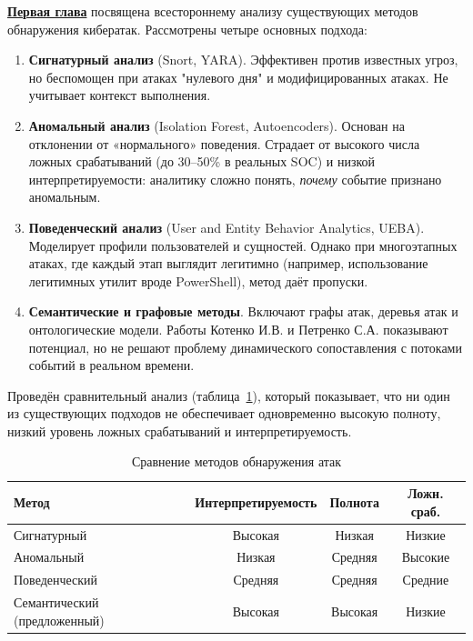 \medskip

\underline{\textbf{Первая глава}} посвящена всестороннему анализу существующих методов обнаружения кибератак. Рассмотрены четыре основных подхода:

\begin{enumerate}
    \item \textbf{Сигнатурный анализ} (Snort, YARA). Эффективен против известных угроз, но беспомощен при атаках "нулевого дня" и модифицированных атаках. Не учитывает контекст выполнения.
    
    \item \textbf{Аномальный анализ} (Isolation Forest, Autoencoders). Основан на отклонении от «нормального» поведения. Страдает от высокого числа ложных срабатываний (до 30–50\% в реальных SOC) и низкой интерпретируемости: аналитику сложно понять, \textit{почему} событие признано аномальным.
    
    \item \textbf{Поведенческий анализ} (User and Entity Behavior Analytics, UEBA). Моделирует профили пользователей и сущностей. Однако при многоэтапных атаках, где каждый этап выглядит легитимно (например, использование легитимных утилит вроде PowerShell), метод даёт пропуски.
    
    \item \textbf{Семантические и графовые методы}. Включают графы атак, деревья атак и онтологические модели. Работы Котенко И.В. и Петренко С.А. показывают потенциал, но не решают проблему динамического сопоставления с потоками событий в реальном времени.
\end{enumerate}

Проведён сравнительный анализ (таблица~\ref{tab:methods-comparison}), который показывает, что ни один из существующих подходов не обеспечивает одновременно высокую полноту, низкий уровень ложных срабатываний и интерпретируемость.

\begin{table}[ht]
\centering
\small
\caption{Сравнение методов обнаружения атак}
\label{tab:methods-comparison}
\begin{tabular}{@{}lccc@{}}
\toprule
Метод & Интерпретируемость & Полнота & Ложн. сраб. \\
\midrule
Сигнатурный & Высокая & Низкая & Низкие \\
Аномальный & Низкая & Средняя & Высокие \\
Поведенческий & Средняя & Средняя & Средние \\
Семантический (предложенный) & Высокая & Высокая & Низкие \\
\bottomrule
\end{tabular}
\end{table}
\medskip

